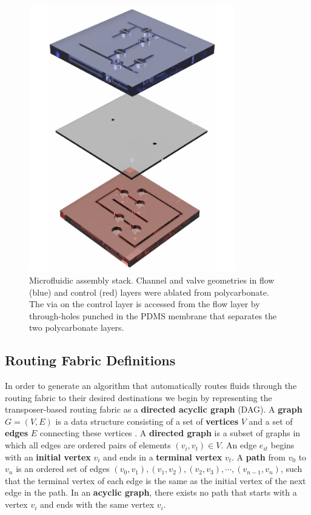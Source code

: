 \begin{figure}[h]
  \begin{minipage}[t]{0.99\linewidth}\centering
    \includegraphics[width=9cm]{fig3.pdf}
    \medskip
  \end{minipage}\hfill
  \caption[Microfluidic assembly stack for a transposer]{Microfluidic assembly stack. Channel and valve geometries in flow (blue) and control (red) layers were ablated from polycarbonate. The via on the control layer is accessed from the flow layer by through-holes punched in the PDMS membrane that separates the two polycarbonate layers.}
	\label{fig:assembly1}
\end{figure}

\subsection{Routing Fabric Definitions}
\label{sec:defs}
In order to generate an algorithm that automatically routes fluids through the routing fabric to their desired destinations we begin by representing the transposer-based routing fabric as a \textbf{directed acyclic graph} (DAG). A \textbf{graph} $G=(V,E)$ is a data structure consisting of a set of \textbf{vertices} $V$ and a set of \textbf{edges} $E$ connecting these vertices \cite{vaidyanathan2015}. A \textbf{directed graph} is a subset of graphs in which all edges are ordered pairs of elements $(v_i, v_t) \in V$. An edge $e_{it}$ begins with an \textbf{initial vertex} $v_i$ and ends in a \textbf{terminal vertex} $v_t$. A \textbf{path} from $v_0$ to $v_n$ is an ordered set of edges $(v_0, v_1),(v_1,v_2),(v_2,v_3),\cdots ,(v_{n-1},v_n)$, such that the terminal vertex of each edge is the same as the initial vertex of the next edge in the path. In an \textbf{acyclic graph}, there exists no path that starts with a vertex $v_i$ and ends with the same vertex $v_i$.

